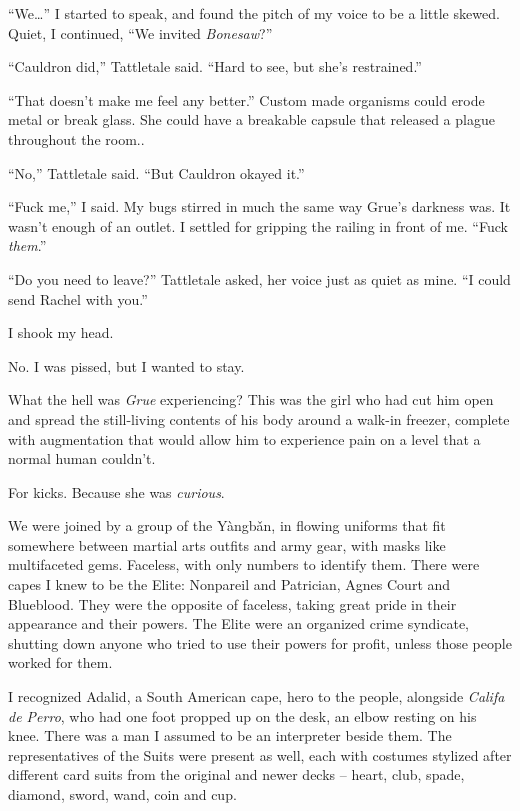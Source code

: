 ``We\ldots'' I started to speak, and found the pitch of my voice to be a little skewed.  Quiet, I continued, ``We invited \emph{Bonesaw}?''



``Cauldron did,'' Tattletale said.  ``Hard to see, but she's restrained.''



``That doesn't make me feel any better.''  Custom made organisms could erode metal or break glass.  She could have a breakable capsule that released a plague throughout the room..



``No,'' Tattletale said.  ``But Cauldron okayed it.''



``Fuck me,'' I said.  My bugs stirred in much the same way Grue's darkness was.  It wasn't enough of an outlet.  I settled for gripping the railing in front of me.  ``Fuck \emph{them}.''



``Do you need to leave?'' Tattletale asked, her voice just as quiet as mine.  ``I could send Rachel with you.''



I shook my head.



No.  I was pissed, but I wanted to stay.



What the hell was \emph{Grue} experiencing?  This was the girl who had cut him open and spread the still-living contents of his body around a walk-in freezer, complete with augmentation that would allow him to experience pain on a level that a normal human couldn't.



For kicks.  Because she was \emph{curious}.



We were joined by a group of the Y\`{a}ngb\v{a}n, in flowing uniforms that fit somewhere between martial arts outfits and army gear, with masks like multifaceted gems.  Faceless, with only numbers to identify them.  There were capes I knew to be the Elite: Nonpareil and Patrician, Agnes Court and Blueblood.  They were the opposite of faceless, taking great pride in their appearance and their powers.  The Elite were an organized crime syndicate, shutting down anyone who tried to use their powers for profit, unless those people worked for them.



I recognized Adalid, a South American cape, hero to the people, alongside \emph{Califa de Perro}, who had one foot propped up on the desk, an elbow resting on his knee.  There was a man I assumed to be an interpreter beside them.  The representatives of the Suits were present as well, each with costumes stylized after different card suits from the original and newer decks – heart, club, spade, diamond, sword, wand, coin and cup.



